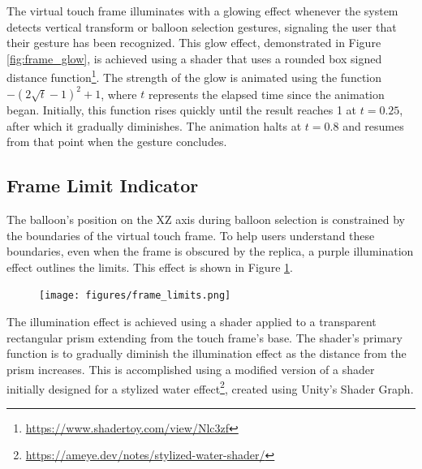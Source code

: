         The virtual touch frame illuminates with a glowing effect whenever the system detects vertical transform or balloon selection gestures, signaling the user that their gesture has been recognized. This glow effect, demonstrated in Figure \ref{fig:frame_glow}, is achieved using a shader that uses a rounded box signed distance function\footnote{\url{https://www.shadertoy.com/view/Nlc3zf}}. The strength of the glow is animated using the function \(-(2 \sqrt{t} - 1)^2 + 1\), where \(t\) represents the elapsed time since the animation began. Initially, this function rises quickly until the result reaches 1 at $t = 0.25$, after which it gradually diminishes. The animation halts at \(t = 0.8\) and resumes from that point when the gesture concludes.
                    


    
    
    \subsection{Frame Limit Indicator} \label{sec:frame_limits}

        The balloon's position on the XZ axis during balloon selection is constrained by the boundaries of the virtual touch frame. To help users understand these boundaries, even when the frame is obscured by the replica, a purple illumination effect outlines the limits. This effect is shown in Figure \ref{fig:frame_limits}.

        \begin{figure}[h!]
            \centering
            \texttt{[image: figures/frame\_limits.png]}
            \label{fig:frame_limits}
        \end{figure}
    
        The illumination effect is achieved using a shader applied to a transparent rectangular prism extending from the touch frame's base. The shader's primary function is to gradually diminish the illumination effect as the distance from the prism increases. This is accomplished using a modified version of a shader initially designed for a stylized water effect\footnote{\url{https://ameye.dev/notes/stylized-water-shader/}}, created using Unity's Shader Graph.
        
